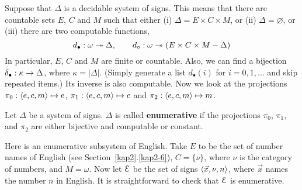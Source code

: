 Suppose that $\Delta$ is a decidable system of signs. This means
that there are countable sets $E$, $C$ and $M$ such that either 
(i) $\Delta = E \times C \times M$, or (ii) $\Delta = \varnothing$, 
or (iii) there are two computable functions, 
\begin{equation}
d_{\bullet} : \omega \twoheadrightarrow \Delta, \qquad 
d_{\circ} : \omega \twoheadrightarrow (E \times C \times M - \Delta)
\end{equation}
In particular, $E$, $C$ and $M$ are finite or countable. Also, we can 
find a bijection $\delta_{\bullet} : \kappa \rightarrow \Delta$, where 
$\kappa = |\Delta|$. (Simply generate a list $d_{\bullet}(i)$ for 
$i = 0,1,\dotsc$ and skip repeated items.) Its inverse is also 
computable. Now we look at the projections $\pi_0 : \langle e, c, m\rangle 
\mapsto e$, $\pi_1 : \langle e,c,m\rangle \mapsto c$ and $\pi_2 : \langle e,c,m\rangle 
\mapsto m$.
\begin{defn}
\label{sign system!enumerative}
Let $\Delta$ be a system of signs. $\Delta$ is called 
\textbf{enumerative} if the projections $\pi_0$, $\pi_1$, 
and $\pi_2$ are either bijective and computable or constant.
\end{defn}
Here is an enumerative subsystem of English. Take $E$ to be 
the set of number names of English (see Section~\ref{kap2}.\ref{kap2-6}), 
$C = \{\nu\}$, where $\nu$ is the category of numbers, and 
$M = \omega$. Now let $\mathcal{E}$ be the set of signs $\langle \vec{x}, 
\nu, n\rangle$, where $\vec{x}$ names the number $n$ in English.
It is straightforward to check that $\mathcal{E}$ is enumerative.

